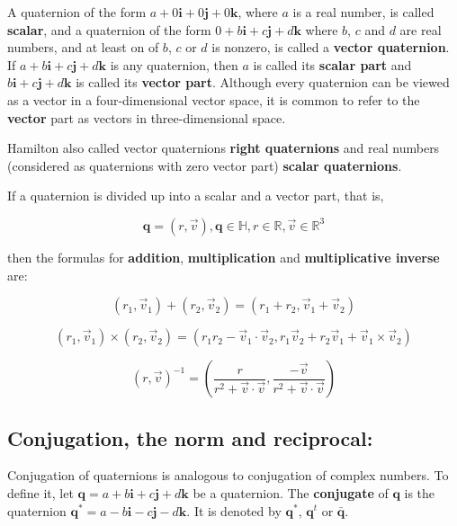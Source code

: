 A quaternion of the form $ a + 0 \mathbf{i} + 0 \mathbf{j} + 0 \mathbf{k} $,
where $ a $ is a real number, is called \textbf{scalar}, and a quaternion of the form
$ 0 + b \mathbf{i} + c \mathbf{j} + d \mathbf{k} $ where $ b $, $ c $ and $ d $
are real numbers, and at least on of $ b $, $ c $ or $ d $ is nonzero, is called
a \textbf{vector quaternion}. If $ a + b \mathbf{i} + c \mathbf{j} + d \mathbf{k} $
is any quaternion, then $ a $ is called its \textbf{scalar part} and
$ b \mathbf{i} + c \mathbf{j} + d \mathbf{k} $ is called its \textbf{vector part}.
Although every quaternion can be viewed as a vector in a four-dimensional
vector space, it is common to refer to the \textbf{vector} part as vectors in
three-dimensional space.

Hamilton also called vector quaternions \textbf{right quaternions} and real
numbers (considered as quaternions with zero vector part) \textbf{scalar quaternions}.

If a quaternion is divided up into a scalar and a vector part, that is,

\begin{equation}
    \mathbf{q} = (r, \vec{v}), \mathbf{q} \in \mathbb{H}, r \in \mathbb{R}, \vec{v} \in \mathbb{R}^3
\end{equation}

then the formulas for \textbf{addition}, \textbf{multiplication}
and \textbf{multiplicative inverse} are:

\begin{equation}
    (r_1, \vec{v}_1) + (r_2, \vec{v}_2) = (r_1 + r_2, \vec{v}_1 + \vec{v}_2 )
\end{equation}

\begin{equation}
    (r_1, \vec{v}_1) \times (r_2, \vec{v}_2) = (r_1 r_2 - \vec{v}_1 \cdot \vec{v}_2, r_1 \vec{v}_2 + r_2 \vec{v}_1 + \vec{v}_1 \times \vec{v}_2)
\end{equation}

\begin{equation}
    (r, \vec{v})^{-1} =
    \left(
        \frac{r} {r^2 + \vec{v} \cdot \vec{v}},
        \frac{-\vec{v}} {r^2 + \vec{v} \cdot \vec{v}}
    \right)
\end{equation}


\subsection{Conjugation, the norm and reciprocal:}

Conjugation of quaternions is analogous to conjugation of complex numbers.
To define it, let $ \mathbf{q} = a + b \mathbf{i} + c \mathbf{j} + d \mathbf{k} $
be a quaternion. The \textbf{conjugate} of $ \mathbf{q} $ is the quaternion
$ \mathbf{q}^{*} = a - b \mathbf{i} - c \mathbf{j} - d \mathbf{k} $.
It is denoted by $ \mathbf{q}^{*} $, $ \mathbf{q}^{t} $ or $ \bar{\mathbf{q}} $.


